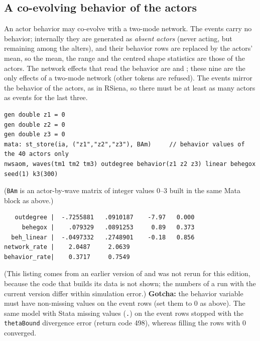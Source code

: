 \subsection{A co-evolving behavior of the actors}

An actor behavior may co-evolve with a two-mode network. The events carry no behavior; internally they are generated as \emph{absent actors} (never acting, but remaining among the alters), and their behavior rows are replaced by the actors' mean, so the mean, the range and the centred shape statistics are those of the actors. The network effects that read the behavior are  and \opt{)}; these nine are the only  effects of a two-mode network (other tokens are refused). The events mirror the behavior of the actors, as in RSiena, so there must be at least as many actors as events for the last three.

\begin{lstlisting}
gen double z1 = 0
gen double z2 = 0
gen double z3 = 0
mata: st_store(ia, ("z1","z2","z3"), BAm)     // behavior values of the 40 actors only
nwsaom, waves(tm1 tm2 tm3) outdegree behavior(z1 z2 z3) linear behegox seed(1) k3(300)
\end{lstlisting}
(\texttt{BAm} is an actor-by-wave matrix of integer values 0--3 built in the same Mata block as above.)
\begin{lstlisting}
   outdegree |  -.7255881   .0910187    -7.97   0.000
     behegox |    .079329   .0891253     0.89   0.373
  beh_linear |  -.0497332   .2748901    -0.18   0.856
network_rate |    2.0487     2.0639
behavior_rate|    0.3717     0.7549
\end{lstlisting}
(This listing comes from an earlier version of \nwsaom{} and was not rerun for this edition, because the code that builds its data is not shown; the numbers of a run with the current version differ within simulation error.)
\textbf{Gotcha:} the behavior variable must have non-missing values on the event rows (set them to 0 as above). The same model with Stata missing values (\texttt{.}) on the event rows stopped with the \texttt{thetaBound} divergence error (return code 498), whereas filling the rows with 0 converged.

